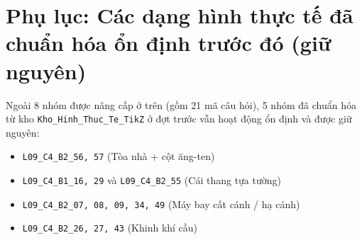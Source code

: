 \documentclass[10pt,a4paper]{article}
\begin{document}
\section*{Phụ lục: Các dạng hình thực tế đã chuẩn hóa ổn định trước đó (giữ nguyên)}
\noindent Ngoài 8 nhóm được nâng cấp ở trên (gồm 21 mã câu hỏi), 5 nhóm đã chuẩn hóa từ kho \texttt{Kho\_Hinh\_Thuc\_Te\_TikZ} ở đợt trước vẫn hoạt động ổn định và được giữ nguyên:
\begin{itemize}
    \item \texttt{L09\_C4\_B2\_56, 57} (Tòa nhà + cột ăng-ten)
    \item \texttt{L09\_C4\_B1\_16, 29} và \texttt{L09\_C4\_B2\_55} (Cái thang tựa tường)
    \item \texttt{L09\_C4\_B2\_07, 08, 09, 34, 49} (Máy bay cất cánh / hạ cánh)
    \item \texttt{L09\_C4\_B2\_26, 27, 43} (Khinh khí cầu)
\end{itemize}
\end{document}
